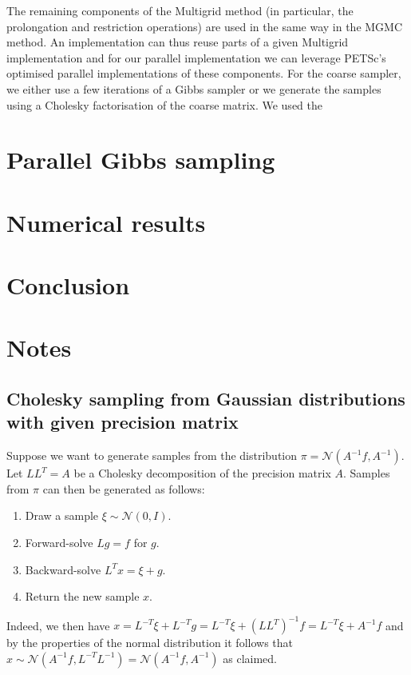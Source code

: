\documentclass[
fontsize=11pt,
paper=a4,
numbers=noenddot
]{scrartcl}
\begin{document}
The remaining components of the Multigrid method (in particular, the prolongation and restriction operations) are used in the same way in the MGMC method. An implementation can thus reuse parts of a given Multigrid implementation and for our parallel implementation we can leverage PETSc's optimised parallel implementations of these components. For the coarse sampler, we either use a few iterations of a Gibbs sampler or we generate the samples using a Cholesky factorisation of the coarse matrix. We used the 

\section{Parallel Gibbs sampling}

\section{Numerical results}

\section{Conclusion}

\section{Notes}
\subsection{Cholesky sampling from Gaussian distributions with given precision matrix}
Suppose we want to generate samples from the distribution $\pi = \mathcal{N}(A^{-1} f, A^{-1})$. Let $LL^T = A$ be a Cholesky decomposition of the precision matrix $A$. Samples from $\pi$ can then be generated as follows:
\begin{enumerate}
    \item Draw a sample $\xi \sim \mathcal{N}(0,I)$.
    \item Forward-solve $L g = f$ for $g$.
    \item Backward-solve $L^T x = \xi + g$.
    \item Return the new sample $x$.
\end{enumerate}
Indeed, we then have $x = L^{-T} \xi + L^{-T} g = L^{-T} \xi + {(LL^T)}^{-1} f =  L^{-T} \xi + A^{-1} f$ and by the properties of the normal distribution it follows that $x \sim \mathcal{N}(A^{-1} f, L^{-T}L^{-1}) = \mathcal{N}(A^{-1} f, A^{-1})$ as claimed.

\printbibliography
\end{document}
